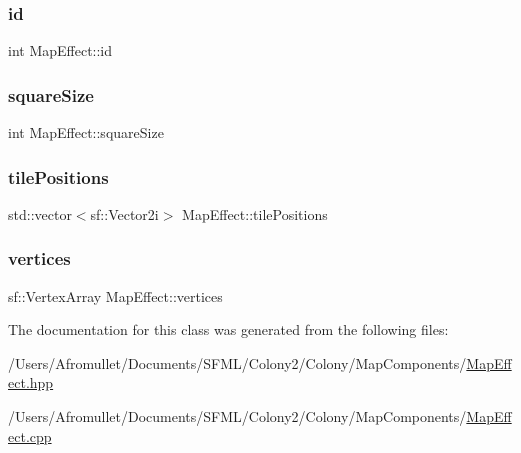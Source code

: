 \mbox{\label{class_map_effect_a9439d21ddced564043eba8fdf2c0e44e}} 
\subsubsection{\texorpdfstring{id}{id}}
{\footnotesize\ttfamily int Map\+Effect\+::id}

\mbox{\label{class_map_effect_a4fb92217a562e90b9038977a2d660e25}} 
\subsubsection{\texorpdfstring{square\+Size}{squareSize}}
{\footnotesize\ttfamily int Map\+Effect\+::square\+Size}

\mbox{\label{class_map_effect_a3a61ab548ae00ef7abd123672c75e579}} 
\subsubsection{\texorpdfstring{tile\+Positions}{tilePositions}}
{\footnotesize\ttfamily std\+::vector$<$sf\+::\+Vector2i$>$ Map\+Effect\+::tile\+Positions}

\mbox{\label{class_map_effect_ae3ee2ef0f261d4527b5af20e788af26e}} 
\subsubsection{\texorpdfstring{vertices}{vertices}}
{\footnotesize\ttfamily sf\+::\+Vertex\+Array Map\+Effect\+::vertices}



The documentation for this class was generated from the following files\+:\begin{DoxyCompactItemize}
\item 
/\+Users/\+Afromullet/\+Documents/\+S\+F\+M\+L/\+Colony2/\+Colony/\+Map\+Components/\mbox{\hyperlink{_map_effect_8hpp}{Map\+Effect.\+hpp}}\item 
/\+Users/\+Afromullet/\+Documents/\+S\+F\+M\+L/\+Colony2/\+Colony/\+Map\+Components/\mbox{\hyperlink{_map_effect_8cpp}{Map\+Effect.\+cpp}}\end{DoxyCompactItemize}
